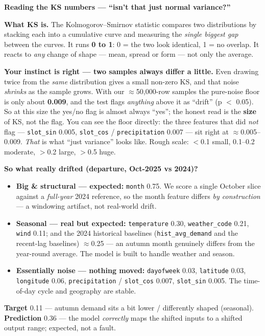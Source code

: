 \documentclass[11pt]{article}
\begin{document}
\smallskip
\noindent\textbf{\color{blue}Reading the KS numbers --- ``isn't that just normal variance?''}
\begin{simple}
\textbf{What KS is.} The Kolmogorov--Smirnov statistic compares two distributions by stacking each into a
cumulative curve and measuring the \emph{single biggest gap} between the curves. It runs \textbf{0 to 1}:
0 = the two look identical, 1 = no overlap. It reacts to \emph{any} change of shape --- mean, spread or
form --- not only the average.

\textbf{Your instinct is right --- two samples always differ a little.} Even drawing twice from the
\emph{same} distribution gives a small non-zero KS, and that noise \emph{shrinks} as the sample grows. With
our $\approx$50{,}000-row samples the pure-noise floor is only about \textbf{0.009}, and the test flags
\emph{anything} above it as ``drift'' (p $<$ 0.05). So at this size the yes/no flag is almost always
``yes''; the honest read is the \textbf{size} of KS, not the flag. You can see the floor directly: the
three features that did \emph{not} flag --- \texttt{slot\_sin} 0.005, \texttt{slot\_cos} /
\texttt{precipitation} 0.007 --- sit right at $\approx$0.005--0.009. \emph{That} is what ``just variance''
looks like. Rough scale: $<$0.1 small, 0.1--0.2 moderate, $>$0.2 large, $>$0.5 huge.

\textbf{So what really drifted (departure, Oct-2025 vs 2024)?}
\begin{itemize}[leftmargin=1.4em, itemsep=2pt]
  \item \textbf{Big \& structural --- expected:} \texttt{month} 0.75. We score a single October slice
        against a \emph{full-year} 2024 reference, so the month feature differs \emph{by construction} ---
        a windowing artifact, not real-world drift.
  \item \textbf{Seasonal --- real but expected:} \texttt{temperature} 0.30, \texttt{weather\_code} 0.21,
        \texttt{wind} 0.11; and the 2024 historical baselines (\texttt{hist\_avg\_demand} and the
        recent-lag baselines) $\approx$0.25 --- an autumn month genuinely differs from the year-round
        average. The model is built to handle weather and season.
  \item \textbf{Essentially noise --- nothing moved:} \texttt{dayofweek} 0.03, \texttt{latitude} 0.03,
        \texttt{longitude} 0.06, \texttt{precipitation} / \texttt{slot\_cos} 0.007, \texttt{slot\_sin} 0.005.
        The time-of-day cycle and geography are stable.
\end{itemize}
\textbf{Target} 0.11 --- autumn demand sits a bit lower / differently shaped (seasonal). \textbf{Prediction}
0.36 --- the model \emph{correctly} maps the shifted inputs to a shifted output range; expected, not a fault.


\end{simple}
\end{document}
